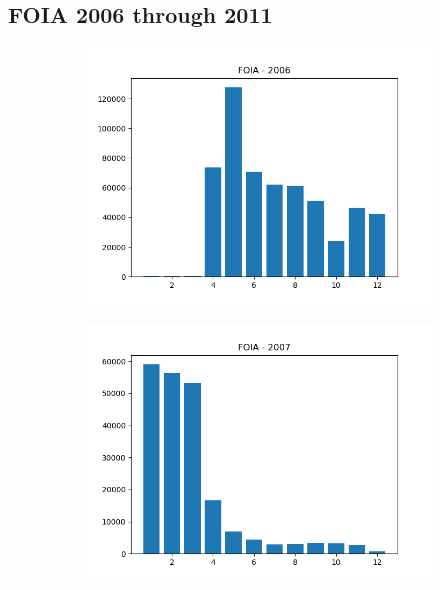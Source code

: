 \documentclass{article}
\begin{document}
\subsection*{FOIA 2006 through 2011}
\begin{figure}[H]
    \begin{subfigure}{.5\textwidth}
        \centering
        \includegraphics[width=\textwidth]{../../output/figures/annual_source_distribution/FOIA_data_dist_2006.png}
    \end{subfigure}
    \begin{subfigure}{.5\textwidth}
        \centering
        \includegraphics[width=\textwidth]{../../output/figures/annual_source_distribution/FOIA_data_dist_2007.png}

\end{subfigure}
\end{figure}
\end{document}
